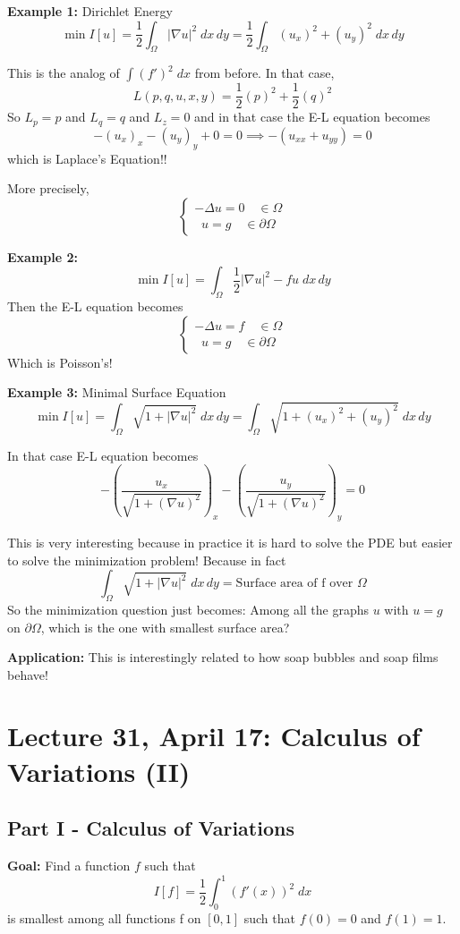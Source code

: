 \documentclass[12pt]{article}
\begin{document}
\textbf{Example 1:} Dirichlet Energy 
\[\min I[u] = \frac{1}{2} \int_{\Omega} |\nabla u|^2 \; dx\, dy = \frac{1}{2}\int_{\Omega} (u_x)^2 + (u_y)^2 \; dx\, dy\]

This is the analog of $\int (f')^2\; dx$ from before. In that case, 
\[L(p, q, u, x, y) = \frac{1}{2}(p)^2 + \frac{1}{2}(q)^2\]
So $L_p =p$ and $L_q = q$ and $L_z = 0$ and in that case the E-L equation becomes 
\[-(u_x)_x - (u_y)_y + 0 = 0 \implies -(u_{xx} + u_{yy}) = 0\]
which is Laplace's Equation!!

More precisely, 
\[\begin{cases}
    -\Delta u = 0 \quad \in \Omega\\
    \;\; u = g \quad \in \partial \Omega
\end{cases}\]

\textbf{Example 2:}
\[\min I[u] = \int_{\Omega} \frac{1}{2}|\nabla u|^2 - fu\; dx\, dy\]
Then the E-L equation becomes 
\[\begin{cases}
    -\Delta u = f \quad \in \Omega\\
    \;\; u = g \quad \in \partial \Omega
\end{cases}\]
Which is Poisson's!

\textbf{Example 3:} Minimal Surface Equation 
\[\min I[u] = \int_{\Omega} \sqrt{1 + |\nabla u|^2}\; dx\, dy = \int_{\Omega} \sqrt{1 + (u_x)^2 + (u_y)^2}\; dx\, dy\]

In that case E-L equation becomes 
\[-\left(\frac{u_x}{\sqrt{1 + (\nabla u)^2}}\right)_x - \left(\frac{u_y}{\sqrt{1 + (\nabla u)^2}}\right)_y = 0\]

This is very interesting because in practice it is hard to solve the PDE but easier to solve the minimization problem!
Because in fact 
\[\int_{\Omega} \sqrt{1 + |\nabla u|^2}\; dx\, dy = \text{Surface area of f over $\Omega$}\]
So the minimization question just becomes: Among all the graphs $u$ with $u = g$ on $\partial \Omega$, which is the one with smallest surface area?

\textbf{Application:} This is interestingly related to how soap bubbles and soap films behave!

\section*{Lecture 31, April 17: Calculus of Variations (II)}
\subsection*{Part I - Calculus of Variations}
\textbf{Goal:} Find a function $f$ such that 
\[I[f] = \frac{1}{2}\int_0^1 (f'(x))^2 \; dx\]
is smallest among all functions f on $[0, 1]$ such that $f(0)=0$ and $f(1)=1$. 
\end{document}
